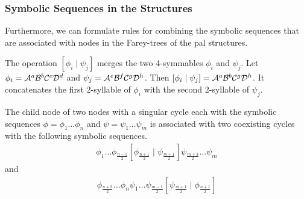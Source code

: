 \subsubsection{Symbolic Sequences in the  Structures}

Furthermore, we can formulate rules for combining the symbolic sequences that are associated with nodes in the Farey-trees of the \gls{pal} structures.

\begin{definition}
	The operation $\left[\phi_i \mid \psi_j\right]$ merges the two 4-symmables $\phi_i$ and $\psi_j$.
	Let $\phi_i = \mathcal{A}^a\mathcal{B}^b\mathcal{C}^c\mathcal{D}^d$ and $\psi_j = \mathcal{A}^e\mathcal{B}^f\mathcal{C}^g\mathcal{D}^h$.
	Then $\left[\phi_i \mid \psi_j\right] = \mathcal{A}^a\mathcal{B}^b\mathcal{C}^g\mathcal{D}^h$.
	It concatenates the first 2-syllable of $\phi_i$ with the second 2-syllable of $\psi_j$.
\end{definition}

\begin{theorem}
	\label{theorem:child.symbolic.1}
	The child node of two nodes with a singular cycle each with the symbolic sequences $\phi = \phi_1 \dots \phi_n$ and $\psi = \psi_1 \dots \psi_m$ is associated with two coexisting cycles with the following symbolic sequences.
	\begin{align}
		\phi_1 \dots \phi_{\frac{n-1}{2}} \left[\phi_{\frac{n+1}{2}} \mid \psi_{\frac{m+1}{2}}\right] \psi_{\frac{m+3}{2}} \dots \psi_m
	\end{align}
	and
	\begin{align}
		\phi_{\frac{n+3}{2}} \dots \phi_n \psi_1 \dots \psi_{\frac{m-1}{2}} \left[\psi_{\frac{m+1}{2}} \mid \phi_{\frac{n+1}{2}}\right]
	\end{align}
\end{theorem}

